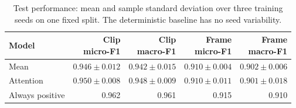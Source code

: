 \begin{table}[H]\centering\small
\caption{Test performance: mean and sample standard deviation over three training seeds on one fixed split. The deterministic baseline has no seed variability.}\label{tab:main}
\begin{tabular}{lrrrr}\toprule
Model & \shortstack{Clip\\micro-F1} & \shortstack{Clip\\macro-F1} & \shortstack{Frame\\micro-F1} & \shortstack{Frame\\macro-F1} \\\midrule
Mean & $0.946 \pm 0.012$ & $0.942 \pm 0.015$ & $0.910 \pm 0.004$ & $0.902 \pm 0.006$ \\
Attention & $0.950 \pm 0.008$ & $0.948 \pm 0.009$ & $0.910 \pm 0.011$ & $0.901 \pm 0.018$ \\
Always positive & 0.962 & 0.961 & 0.915 & 0.910 \\
\bottomrule\end{tabular}\end{table}
